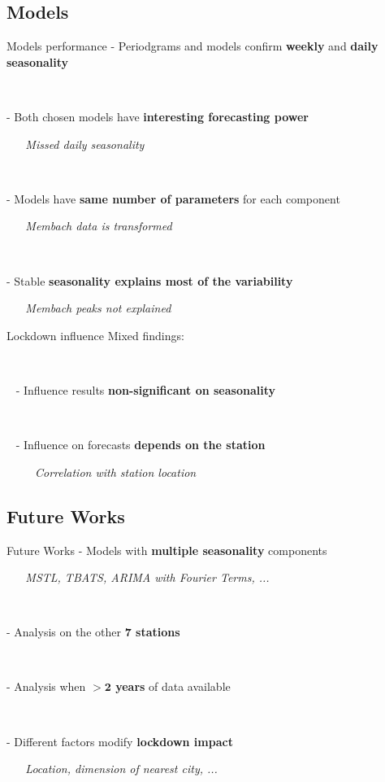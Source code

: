 \documentclass{beamer}
\begin{document}
\subsection{Models}

\begin{frame}{Models performance}
	- Periodgrams and models confirm \textbf{weekly} and \textbf{daily seasonality}

	~

	- Both chosen models have \textbf{interesting forecasting power}

	~ ~ \textit{Missed daily seasonality}

	~

	- Models have \textbf{same number of parameters} for each component

	~ ~ \textit{Membach data is transformed}

	~

	- Stable \textbf{seasonality explains most of the variability}

	~ ~ \textit{Membach peaks not explained}
\end{frame}

\begin{frame}{Lockdown influence}
	Mixed findings:

	~

	~ - Influence results \textbf{non-significant on seasonality}

	~

	~ - Influence on forecasts \textbf{depends on the station}

	~ ~ ~ \textit{Correlation with station location}

\end{frame}

\subsection{Future Works}
\begin{frame}{Future Works}
	- Models with \textbf{multiple seasonality} components

	~ ~ \textit{MSTL, TBATS, ARIMA with Fourier Terms, ...}

	~

	- Analysis on the other \textbf{7 stations}

	~

	- Analysis when \textbf{$\mathbf{> 2}$ years} of data available

	~

	- Different factors modify \textbf{lockdown impact}

	~ ~ \textit{Location, dimension of nearest city, ...}
\end{frame}
\end{document}
